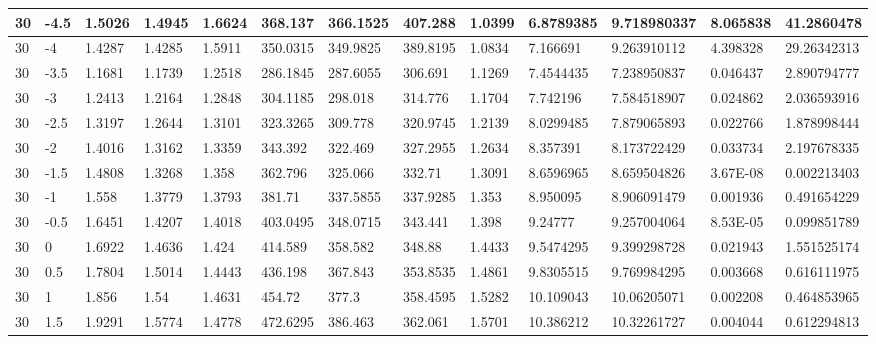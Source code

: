 \begin{longtable}{|l|l|l|l|l|l|l|l|l|l|l|l|l|}
30    & -4.5  & 1.5026  & 1.4945  & 1.6624  & 368.137  & 366.1525 & 407.288  & 1.0399   & 6.8789385   & 9.718980337    & 8.065838                 & 41.2860478  \\ \hline
30    & -4    & 1.4287  & 1.4285  & 1.5911  & 350.0315 & 349.9825 & 389.8195 & 1.0834   & 7.166691    & 9.263910112    & 4.398328                 & 29.26342313 \\ \hline
30    & -3.5  & 1.1681  & 1.1739  & 1.2518  & 286.1845 & 287.6055 & 306.691  & 1.1269   & 7.4544435   & 7.238950837    & 0.046437                 & 2.890794777 \\ \hline
30    & -3    & 1.2413  & 1.2164  & 1.2848  & 304.1185 & 298.018  & 314.776  & 1.1704   & 7.742196    & 7.584518907    & 0.024862                 & 2.036593916 \\ \hline
30    & -2.5  & 1.3197  & 1.2644  & 1.3101  & 323.3265 & 309.778  & 320.9745 & 1.2139   & 8.0299485   & 7.879065893    & 0.022766                 & 1.878998444 \\ \hline
30    & -2    & 1.4016  & 1.3162  & 1.3359  & 343.392  & 322.469  & 327.2955 & 1.2634   & 8.357391    & 8.173722429    & 0.033734                 & 2.197678335 \\ \hline
30    & -1.5  & 1.4808  & 1.3268  & 1.358   & 362.796  & 325.066  & 332.71   & 1.3091   & 8.6596965   & 8.659504826    & 3.67E-08                 & 0.002213403 \\ \hline
30    & -1    & 1.558   & 1.3779  & 1.3793  & 381.71   & 337.5855 & 337.9285 & 1.353    & 8.950095    & 8.906091479    & 0.001936                 & 0.491654229 \\ \hline
30    & -0.5  & 1.6451  & 1.4207  & 1.4018  & 403.0495 & 348.0715 & 343.441  & 1.398    & 9.24777     & 9.257004064    & 8.53E-05                 & 0.099851789 \\ \hline
30    & 0     & 1.6922  & 1.4636  & 1.424   & 414.589  & 358.582  & 348.88   & 1.4433   & 9.5474295   & 9.399298728    & 0.021943                 & 1.551525174 \\ \hline
30    & 0.5   & 1.7804  & 1.5014  & 1.4443  & 436.198  & 367.843  & 353.8535 & 1.4861   & 9.8305515   & 9.769984295    & 0.003668                 & 0.616111975 \\ \hline
30    & 1     & 1.856   & 1.54    & 1.4631  & 454.72   & 377.3    & 358.4595 & 1.5282   & 10.109043   & 10.06205071    & 0.002208                 & 0.464853965 \\ \hline
30    & 1.5   & 1.9291  & 1.5774  & 1.4778  & 472.6295 & 386.463  & 362.061  & 1.5701   & 10.386212   & 10.32261727    & 0.004044                 & 0.612294813 \\ \hline

\end{longtable}
